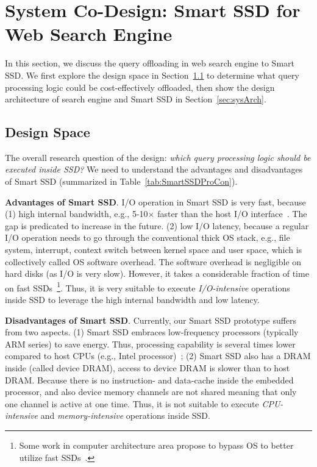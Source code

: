 
\section{System Co-Design: Smart SSD for Web Search Engine}\label{sec:design}
In this section, we discuss the query offloading in web search engine to Smart SSD.
We first explore the design space in Section~\ref{sec:designSpace} to determine what query processing logic could be cost-effectively offloaded,
then show the design architecture of search engine and Smart SSD in Section~\ref{sec:sysArch}.

\subsection{Design Space}\label{sec:designSpace}

The overall research question of the design: \emph{which query processing logic should be executed inside SSD?} We need to understand the advantages and disadvantages of Smart SSD (summarized in Table~\ref{tab:SmartSSDProCon}).

\textbf{Advantages of Smart SSD}. I/O operation in Smart SSD is very fast, because (1) high internal bandwidth, e.g., 5-10$\times$ faster than the host I/O interface~\cite{Do2013QPS,De2013}. The gap is predicated to increase in the future. (2) low I/O latency, because a regular I/O operation needs to go through the conventional thick OS stack, e.g., file system, interrupt, context switch between kernel space and user space, which is collectively called OS software overhead. The software overhead is negligible on hard disks (as I/O is very slow). However, it takes a considerable fraction of time on fast SSDs~\cite{Caulfield2010}\footnote{Some work in computer architecture area propose to bypass OS to better utilize fast SSDs~\cite{Caulfield2010}.}. Thus, it is very suitable to execute \emph{I/O-intensive} operations inside SSD to leverage the high internal bandwidth and low latency.

\textbf{Disadvantages of Smart SSD}. Currently, our Smart SSD prototype suffers from two aspects. (1) Smart SSD embraces low-frequency processors (typically ARM series) to save energy. Thus, processing capability is several times lower compared to host CPUs (e.g., Intel processor)~\cite{Do2013QPS,De2013}; (2) Smart SSD also has a DRAM inside (called device DRAM), access to device DRAM is slower than to host DRAM. Because there is no instruction- and data-cache inside the embedded processor, and also device memory channels are not shared meaning that only one channel is active at one time. Thus, it is not suitable to execute \emph{CPU-intensive} and \emph{memory-intensive} operations inside SSD.

